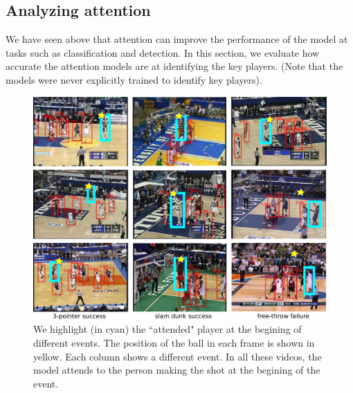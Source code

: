 \subsection{Analyzing attention}

We have seen above that attention can improve the performance of the
model at tasks such as classification and detection. 
In this section, we evaluate how accurate the attention models are at
identifying the key players. (Note that the models were never
explicitly trained to identify key players).



\begin{figure}[t!]
\begin{center}
   \includegraphics[width=1.0\linewidth]{images/visual_examples_v2.pdf}
\end{center}
   \caption{We highlight (in cyan) the ``attended" player at the begining of different events.
     The position of the ball in each frame is shown in yellow.
   Each column shows a different event. In all these videos, the model attends
 to the person making the shot at the begining of the event.}
\label{fig:visual_attention}
\end{figure}




